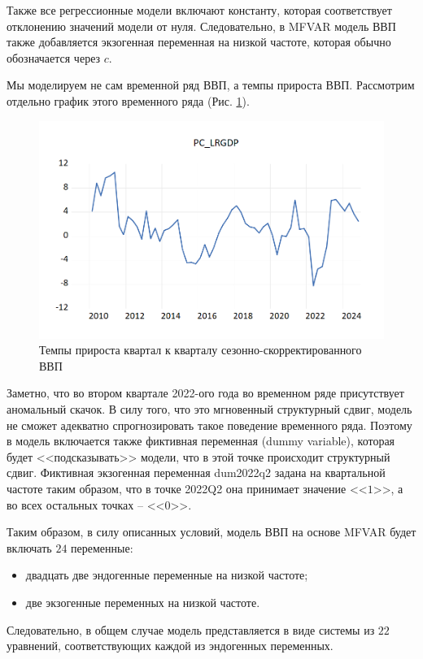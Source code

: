 \documentclass[a4paper, 14pt]{extreport}
\numberwithin{equation}{section}
\numberwithin{equation}{section}
\begin{document}
	Также все регрессионные модели включают константу, которая соответствует отклонению значений модели от нуля. Следовательно, в MFVAR модель ВВП также добавляется экзогенная переменная на низкой частоте, которая обычно обозначается через $c$.
	
	Мы моделируем не сам временной ряд ВВП, а темпы прироста ВВП. Рассмотрим отдельно график этого временного ряда (Рис. \ref{fig:image42}).
	\begin{figure}[h!]
		\centering
		\includegraphics[scale=0.7]{images/image42}
		\caption{Темпы прироста квартал к кварталу сезонно-скорректированного ВВП}
		\label{fig:image42}
	\end{figure}
	Заметно, что во втором квартале 2022-ого года во временном ряде присутствует аномальный скачок. В силу того, что это мгновенный структурный сдвиг, модель не сможет адекватно спрогнозировать такое поведение временного ряда. Поэтому в модель включается также фиктивная переменная (dummy variable), которая будет <<подсказывать>> модели, что в этой точке происходит структурный сдвиг. Фиктивная экзогенная переменная dum2022q2 задана на квартальной частоте таким образом, что в точке 2022Q2 она принимает значение <<$1$>>, а во всех остальных точках -- <<$0$>>.
	
	Таким образом, в силу описанных условий, модель ВВП на основе MFVAR будет включать $24$ переменные:
	\begin{itemize}
		\item двадцать две эндогенные переменные на низкой частоте;
		\item две экзогенные переменных на низкой частоте.
	\end{itemize}
	Следовательно, в общем случае модель представляется в виде системы из $22$ уравнений, соответствующих каждой из эндогенных переменных.
	
\end{document}
